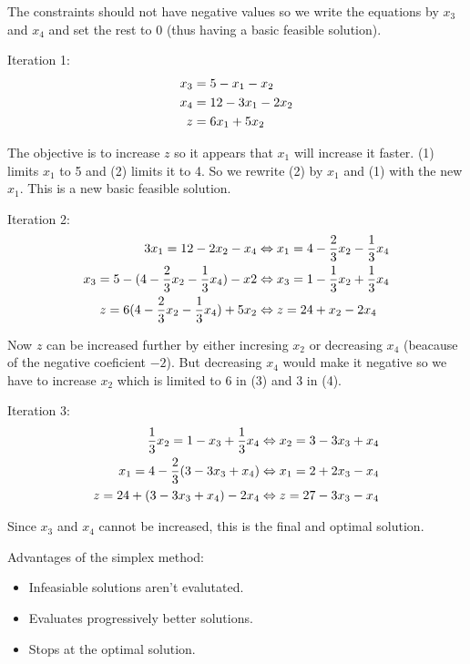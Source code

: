 \documentclass[12pt]{article}
\begin{document}
The constraints should not have negative values so we write the equations by
$x_3$ and $x_4$ and set the rest to 0 (thus having a basic feasible solution).

Iteration 1:
\setcounter{equation}{0}
\begin{align}
    x_3 &= 5 - x_1 - x_2 \\
    x_4 &= 12 - 3x_1 - 2x_2 \\
    z &= 6x_1 + 5x_2 \notag
\end{align}

The objective is to increase $z$ so it appears that $x_1$ will increase it
faster. (1) limits $x_1$ to 5 and (2) limits it to 4. So we rewrite (2) by
$x_1$ and (1) with the new $x_1$. This is a new basic feasible solution.

Iteration 2:
\begin{align}
    3x_1 = 12 - 2x_2 - x_4 &\Leftrightarrow
        x_1 = 4 - \frac{2}{3}x_2 - \frac{1}{3}x_4 \\
    x_3 = 5 - (4 - \frac{2}{3}x_2 - \frac{1}{3}x_4) - x2 &\Leftrightarrow
        x_3 = 1 - \frac{1}{3}x_2 + \frac{1}{3}x_4 \\
    z = 6 (4 - \frac{2}{3}x_2 - \frac{1}{3}x_4) + 5x_2 &\Leftrightarrow
        z = 24 + x_2 - 2x_4 \notag
\end{align}

Now $z$ can be increased further by either incresing $x_2$ or decreasing $x_4$
(beacause of the negative coeficient $-2$). But decreasing $x_4$ would make it
negative so we have to increase $x_2$ which is limited to 6 in (3) and 3 in (4).

Iteration 3:
\begin{align}
    \frac{1}{3}x_2 = 1 - x_3 + \frac{1}{3}x_4 &\Leftrightarrow
        x_2 = 3 - 3x_3 + x_4 \\
    x_1 = 4 - \frac{2}{3}(3 - 3x_3 + x_4) &\Leftrightarrow
        x_1 = 2 + 2x_3 - x_4 \\
    z = 24 + (3 - 3x_3 + x_4) - 2x_4 &\Leftrightarrow
        z = 27 - 3x_3 - x_4 \notag
\end{align}

Since $x_3$ and $x_4$ cannot be increased, this is the final and optimal
solution.

Advantages of the simplex method:

\begin{itemize}
    \item Infeasiable solutions aren't evalutated.
    \item Evaluates progressively better solutions.
    \item Stops at the optimal solution.
\end{itemize}
\end{document}
